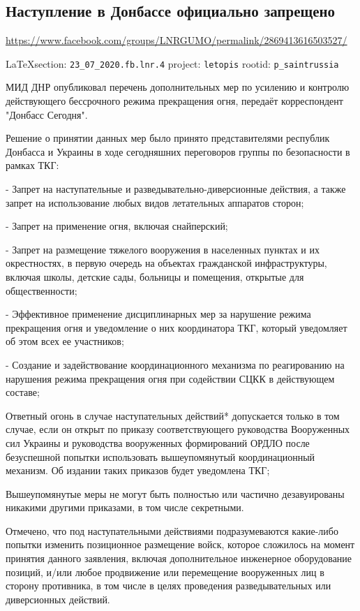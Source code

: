  
 
\subsection{Наступление в Донбассе официально запрещено}
\url{https://www.facebook.com/groups/LNRGUMO/permalink/2869413616503527/}

\vspace{0.5cm}
{\small\LaTeX section: \verb|23_07_2020.fb.lnr.4| project: \verb|letopis| rootid: \verb|p_saintrussia|}
\vspace{0.5cm}

МИД ДНР опубликовал перечень дополнительных мер по усилению и контролю
действующего бессрочного режима прекращения огня, передаёт корреспондент
"Донбасс Сегодня".

Решение о принятии данных мер было принято представителями республик Донбасса и
Украины в ходе сегодняшних переговоров группы по безопасности в рамках ТКГ:

- Запрет на наступательные и разведывательно-диверсионные действия, а также
запрет на использование любых видов летательных аппаратов сторон;

- Запрет на применение огня, включая снайперский;

- Запрет на размещение тяжелого вооружения в населенных пунктах и их
окрестностях, в первую очередь на объектах гражданской инфраструктуры, включая
школы, детские сады, больницы и помещения, открытые для общественности;

- Эффективное применение дисциплинарных мер за нарушение режима прекращения
огня и уведомление о них координатора ТКГ, который уведомляет об этом всех ее
участников;

- Создание и задействование координационного механизма по реагированию на
нарушения режима прекращения огня при содействии СЦКК в действующем составе;

Ответный огонь в случае наступательных действий* допускается только в том
случае, если он открыт по приказу соответствующего руководства Вооруженных сил
Украины и руководства вооруженных формирований ОРДЛО после безуспешной попытки
использовать вышеупомянутый координационный механизм. Об издании таких приказов
будет уведомлена ТКГ;

Вышеупомянутые меры не могут быть полностью или частично дезавуированы никакими
другими приказами, в том числе секретными.

Отмечено, что под наступательными действиями подразумеваются какие-либо попытки
изменить позиционное размещение войск, которое сложилось на момент принятия
данного заявления, включая дополнительное инженерное оборудование позиций,
и/или любое продвижение или перемещение вооруженных лиц в сторону противника, в
том числе в целях проведения разведывательных или диверсионных действий.

